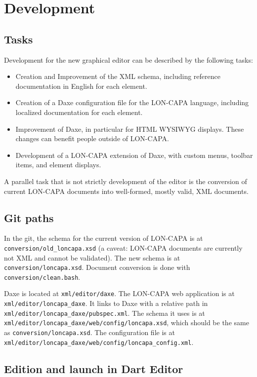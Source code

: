 \section{Development}

\subsection{Tasks}

Development for the new graphical editor can be described by the following tasks:
\begin{itemize}
\item Creation and Improvement of the XML schema, including reference documentation in English for each element.
\item Creation of a Daxe configuration file for the LON-CAPA language, including localized documentation for each element.
\item Improvement of Daxe, in particular for HTML WYSIWYG displays. These changes can benefit people outside of LON-CAPA.
\item Development of a LON-CAPA extension of Daxe, with custom menus, toolbar items, and element displays.
\end{itemize}
A parallel task that is not strictly development of the editor is the conversion of current LON-CAPA documents into well-formed, mostly valid, XML documents.

\subsection{Git paths}

In the git, the schema for the current version of LON-CAPA is at \texttt{conversion/old\_loncapa.xsd} (a caveat: LON-CAPA documents are currently not XML and cannot be validated). The new schema is at \texttt{conversion/loncapa.xsd}. Document conversion is done with \texttt{conversion/clean.bash}.

Daxe is located at \texttt{xml/editor/daxe}. The LON-CAPA web application is at \texttt{xml/editor/loncapa\_daxe}. It links to Daxe with a relative path in \texttt{xml/editor/loncapa\_daxe/pubspec.xml}. The schema it uses is at \texttt{xml/editor/loncapa\_daxe/web/config/loncapa.xsd}, which should be the same as \texttt{conversion/loncapa.xsd}. The configuration file is at \texttt{xml/editor/loncapa\_daxe/web/config/loncapa\_config.xml}.

\subsection{Edition and launch in Dart Editor}

